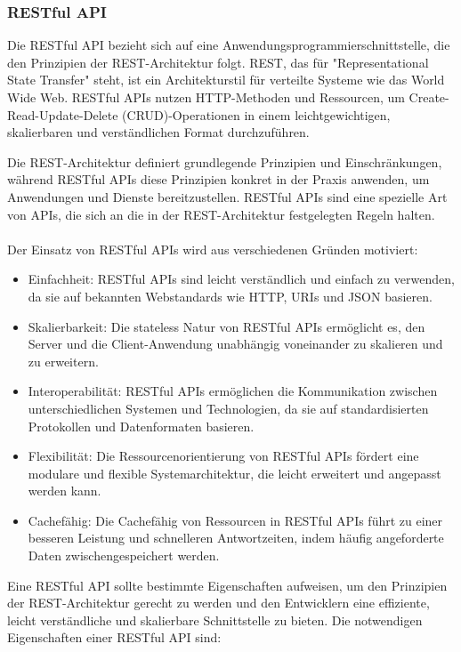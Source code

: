 \subsubsection{RESTful API}

Die RESTful API bezieht sich auf eine Anwendungsprogrammierschnittstelle, die den Prinzipien der REST-Architektur folgt. REST, das für "Representational State Transfer" steht, ist ein Architekturstil für verteilte Systeme wie das World Wide Web. RESTful APIs nutzen HTTP-Methoden und Ressourcen, um Create-Read-Update-Delete (CRUD)-Operationen in einem leichtgewichtigen, skalierbaren und verständlichen Format durchzuführen.

Die REST-Architektur definiert grundlegende Prinzipien und Einschränkungen, während RESTful APIs diese Prinzipien konkret in der Praxis anwenden, um Anwendungen und Dienste bereitzustellen. RESTful APIs sind eine spezielle Art von APIs, die sich an die in der REST-Architektur festgelegten Regeln halten.
\\\\
Der Einsatz von RESTful APIs wird aus verschiedenen Gründen motiviert:
\begin{itemize}
\item Einfachheit: RESTful APIs sind leicht verständlich und einfach zu verwenden, da sie auf bekannten Webstandards wie HTTP, URIs und JSON basieren.
\item Skalierbarkeit: Die stateless Natur von RESTful APIs ermöglicht es, den Server und die Client-Anwendung unabhängig voneinander zu skalieren und zu erweitern.
\item Interoperabilität: RESTful APIs ermöglichen die Kommunikation zwischen unterschiedlichen Systemen und Technologien, da sie auf standardisierten Protokollen und Datenformaten basieren.
\item Flexibilität: Die Ressourcenorientierung von RESTful APIs fördert eine modulare und flexible Systemarchitektur, die leicht erweitert und angepasst werden kann.
\item Cachefähig: Die Cachefähig von Ressourcen in RESTful APIs führt zu einer besseren Leistung und schnelleren Antwortzeiten, indem häufig angeforderte Daten zwischengespeichert werden.
\end{itemize}
Eine RESTful API sollte bestimmte Eigenschaften aufweisen, um den Prinzipien der REST-Architektur gerecht zu werden und den Entwicklern eine effiziente, leicht verständliche und skalierbare Schnittstelle zu bieten. Die notwendigen Eigenschaften einer RESTful API sind:
